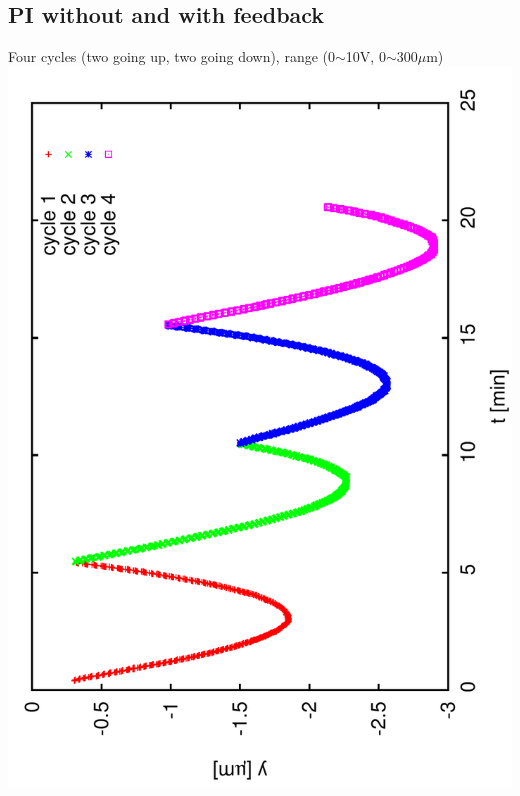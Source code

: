 \documentclass[a4paper,11pt]{book}
\begin{document}
\subsection{PI without and with feedback}
Four cycles (two going up, two going down), range (0$\sim$10V, 0$\sim$300$\mu$m)\\
\includegraphics[angle=-90,scale=0.15]{image51.pdf}
\end{document}
